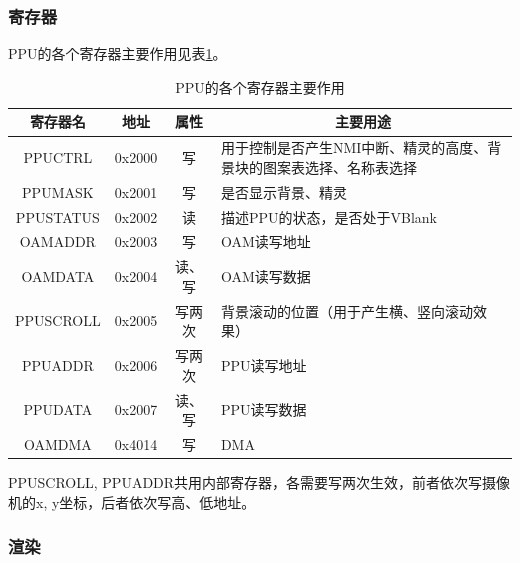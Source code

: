 \documentclass[a4paper]{ltxdoc}
\begin{document}
{\subsubsection{寄存器}
PPU的各个寄存器主要作用见表\ref{tab:ppu_registers}。

\begin{table}[h]
\centering
\caption{PPU的各个寄存器主要作用}
\label{tab:ppu_registers}
\begin{tabularx}{\textwidth}{|c|c|c|X|}
\hline
\rowcolor[HTML]{8DCDFF}
\hline
\rowcolor[HTML]{8DCDFF}
寄存器名      & 地址     & 属性  & \multicolumn{1}{c|}{\cellcolor[HTML]{8DCDFF}主要用途} \\ \hline
PPUCTRL   & 0x2000 & 写   & 用于控制是否产生NMI中断、精灵的高度、背景块的图案表选择、名称表选择               \\ \hline
PPUMASK   & 0x2001 & 写   & 是否显示背景、精灵                                         \\ \hline
PPUSTATUS & 0x2002 & 读   & 描述PPU的状态，是否处于VBlank                               \\ \hline
OAMADDR   & 0x2003 & 写   & OAM读写地址                                           \\ \hline
OAMDATA   & 0x2004 & 读、写 & OAM读写数据                                           \\ \hline
PPUSCROLL & 0x2005 & 写两次 & 背景滚动的位置（用于产生横、竖向滚动效果）                             \\ \hline
PPUADDR   & 0x2006 & 写两次 & PPU读写地址                                           \\ \hline
PPUDATA   & 0x2007 & 读、写 & PPU读写数据                                           \\ \hline
OAMDMA    & 0x4014 & 写   & DMA                                               \\ \hline
\end{tabularx}
\end{table}

PPUSCROLL, PPUADDR共用内部寄存器\cite{ppuscrolling}，各需要写两次生效，前者依次写摄像机的x, y坐标，后者依次写高、低地址。

\subsubsection{渲染}

}

{
\clearpage %
\nocite{*} %
}
\end{document}
